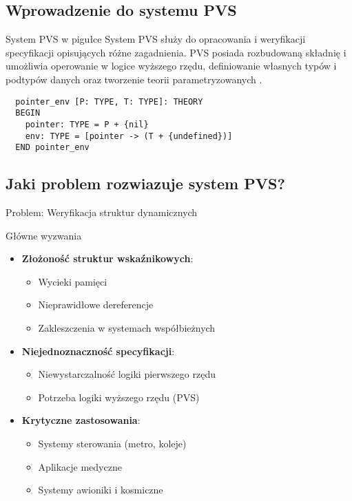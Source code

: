 \documentclass{beamer}
\begin{document}
\subsection{Wprowadzenie do systemu PVS}
\begin{frame}[fragile]{System PVS w pigułce}
  System PVS służy do opracowania i weryfikacji specyfikacji opisujących
  różne zagadnienia. PVS posiada rozbudowaną składnię i umożliwia operowanie w
  logice wyższego rzędu, definiowanie własnych typów i podtypów danych oraz
  tworzenie teorii parametryzowanych \cite{paper}.

\begin{verbatim}
  pointer_env [P: TYPE, T: TYPE]: THEORY
  BEGIN
    pointer: TYPE = P + {nil}
    env: TYPE = [pointer -> (T + {undefined})]
  END pointer_env
\end{verbatim}
\end{frame}

\subsection{Jaki problem rozwiazuje system PVS?}
\begin{frame}{Problem: Weryfikacja struktur dynamicznych}
\begin{alertblock}{Główne wyzwania}
  \begin{itemize}
  \item \textbf{Złożoność struktur wskaźnikowych}:
  \begin{itemize}
      \item Wycieki pamięci
      \item Nieprawidłowe dereferencje
      \item Zakleszczenia w systemach współbieżnych
  \end{itemize}
  
  \item \textbf{Niejednoznaczność specyfikacji}:
  \begin{itemize}
      \item Niewystarczalność logiki pierwszego rzędu
      \item Potrzeba logiki wyższego rzędu (PVS)
  \end{itemize}
  
  \item \textbf{Krytyczne zastosowania}:
  \begin{itemize}
      \item Systemy sterowania (metro, koleje)
      \item Aplikacje medyczne
      \item Systemy awioniki i kosmiczne
  \end{itemize}
\end{itemize}
\end{alertblock}
\end{frame}
\end{document}
